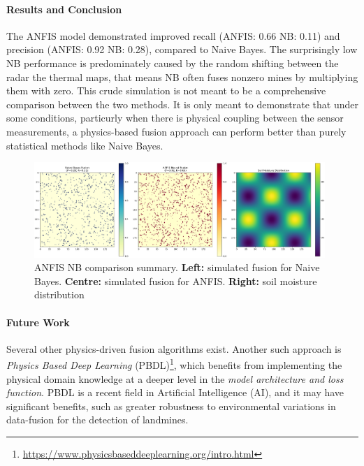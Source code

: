     
\paragraph{Results and Conclusion}  

    The ANFIS model demonstrated improved recall (ANFIS: 0.66 NB: 0.11) and precision (ANFIS: 0.92 NB: 0.28), compared to Naive Bayes. The surprisingly low NB performance is predominately caused by the random shifting between the radar the thermal maps, that means NB often fuses nonzero mines by multiplying them with zero. 
    This crude simulation is not meant to be a comprehensive comparison between the two methods. It is only meant to demonstrate that under some conditions, particurly when there is physical coupling between the sensor measurements, a physics-based fusion approach can perform better than purely statistical methods like Naive Bayes. 
    
    \begin{figure}[h]
        \centering
        \includegraphics[width=0.98\textwidth]{figs/Rory/0_summary.png}
        \caption{ANFIS NB comparison summary. \textbf{Left:} simulated fusion for Naive Bayes. \textbf{Centre:} simulated fusion for ANFIS. \textbf{Right:} soil moisture distribution}
        \label{fig:anfis_summary}
    \end{figure}

    \paragraph{Future Work} 

        Several other physics-driven fusion algorithms exist. Another such approach is \textit{Physics Based Deep Learning} (PBDL)\footnote{\url{https://www.physicsbaseddeeplearning.org/intro.html}}, which benefits from implementing the physical domain knowledge at a deeper level in the \textit{model architecture and loss function}. PBDL is a recent field in Artificial Intelligence (AI), and it may have significant benefits, such as greater robustness to environmental variations in data-fusion for the detection of landmines.

